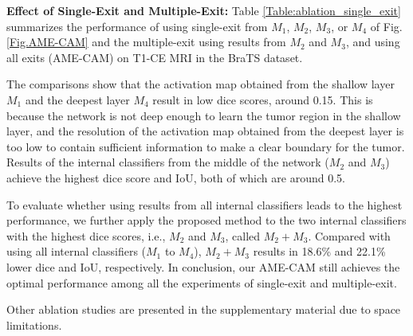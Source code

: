 
\textbf{Effect of Single-Exit and Multiple-Exit:} Table \ref{Table:ablation_single_exit} summarizes the performance of using single-exit from $M_1$, $M_2$, $M_3$, or $M_4$ of Fig. \ref{Fig.AME-CAM} and the multiple-exit using results from $M_2$ and $M_3$, and using all exits (AME-CAM) on T1-CE MRI in the BraTS dataset.

The comparisons show that the activation map obtained from the shallow layer $M_1$ and the deepest layer $M_4$ result in low dice scores, around 0.15. This is because the network is not deep enough to learn the tumor region in the shallow layer, and the resolution of the activation map obtained from the deepest layer is too low to contain sufficient information to make a clear boundary for the tumor. Results of the internal classifiers from the middle of the network ($M_2$ and $M_3$) achieve the highest dice score and IoU, both of which are around 0.5.

To evaluate whether using results from all internal classifiers leads to the highest performance, we further apply the proposed method to the two internal classifiers with the highest dice scores, i.e., $M_2$ and $M_3$, called $M_2+M_3$. Compared with using all internal classifiers ($M_1$ to $M_4$), $M_2+M_3$ results in 18.6\% and 22.1\% lower dice and IoU, respectively. In conclusion, our AME-CAM still achieves the optimal performance among all the experiments of single-exit and multiple-exit.

Other ablation studies are presented in the supplementary material due to space limitations.